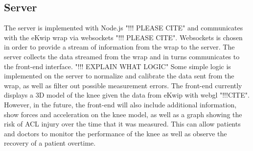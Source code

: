 \subsection {Server}
The server is implemented with Node.js "!!! PLEASE CITE" and communicates with the eKwip wrap via websockets "!!! PLEASE CITE". Websockets is chosen in order to provide a stream of information from the wrap to the server. The server collects the data streamed from the wrap and in turns communicates to the front-end interface. "!!! EXPLAIN WHAT LOGIC" Some simple logic is implemented on the server to normalize and calibrate the data sent from the wrap, as well as filter out possible measurement errors. The front-end currently displays a 3D model of the knee given the data from eKwip with webgl "!!!CITE". However, in the future, the front-end will also include additional information, show forces and acceleration on the knee model, as well as a graph showing the risk of ACL injury over the time that it was measured. This can allow patients and doctors to monitor the performance of the knee as well as observe the recovery of a patient overtime.
